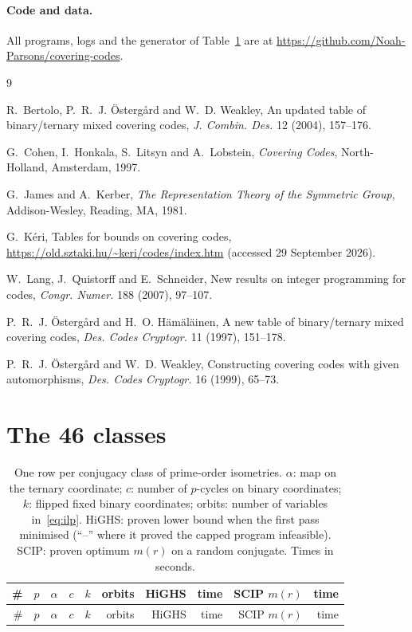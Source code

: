 \documentclass[11pt]{article}
\theoremstyle{definition}
\theoremstyle{remark}
\begin{document}
\paragraph{Code and data.} All programs, logs and the generator of Table~\ref{tab:classes} are at
\url{https://github.com/Noah-Parsons/covering-codes}.

\begin{thebibliography}{9}

R.~Bertolo, P.~R.~J. Östergård and W.~D. Weakley,
An updated table of binary/ternary mixed covering codes,
\emph{J. Combin. Des.} 12 (2004), 157--176.

G.~Cohen, I.~Honkala, S.~Litsyn and A.~Lobstein,
\emph{Covering Codes}, North-Holland, Amsterdam, 1997.

G.~James and A.~Kerber,
\emph{The Representation Theory of the Symmetric Group},
Addison-Wesley, Reading, MA, 1981.

G.~Kéri, Tables for bounds on covering codes,
\url{https://old.sztaki.hu/~keri/codes/index.htm} (accessed 29 September 2026).

W.~Lang, J.~Quistorff and E.~Schneider,
New results on integer programming for codes,
\emph{Congr. Numer.} 188 (2007), 97--107.

P.~R.~J. Östergård and H.~O. Hämäläinen,
A new table of binary/ternary mixed covering codes,
\emph{Des. Codes Cryptogr.} 11 (1997), 151--178.

P.~R.~J. Östergård and W.~D. Weakley,
Constructing covering codes with given automorphisms,
\emph{Des. Codes Cryptogr.} 16 (1999), 65--73.

\end{thebibliography}

\clearpage
\appendix
\section{The 46 classes}

\begin{center}
\small
\begin{longtable}{rrcrrrrrrr}
\caption{One row per conjugacy class of prime-order isometries. $\alpha$: map on the ternary
coordinate; $c$: number of $p$-cycles on binary coordinates; $k$: flipped fixed binary
coordinates; orbits: number of variables in~\eqref{eq:ilp}. HiGHS: proven lower bound when the
first pass minimised (``--'' where it proved the capped program infeasible). SCIP: proven
optimum $m(r)$ on a random conjugate. Times in seconds.}\label{tab:classes}\\
\toprule
\# & $p$ & $\alpha$ & $c$ & $k$ & orbits & HiGHS & time & SCIP $m(r)$ & time \\
\midrule
\endfirsthead
\toprule
\# & $p$ & $\alpha$ & $c$ & $k$ & orbits & HiGHS & time & SCIP $m(r)$ & time \\
\midrule
\endhead

\end{longtable}
\end{center}
\end{document}
